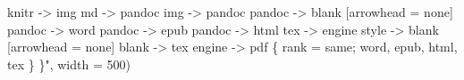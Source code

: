 \documentclass[12pt, oneside]{queensuthesis}
\numberwithin{equation}{chapter}       %
\newenvironment{Shaded}{\begin{snugshade}}{\end{snugshade}}
\newcommand{\AttributeTok}[1]{\textcolor[rgb]{0.77,0.63,0.00}{#1}}
\newcommand{\DecValTok}[1]{\textcolor[rgb]{0.00,0.00,0.81}{#1}}
\newcommand{\NormalTok}[1]{#1}
\newcommand{\StringTok}[1]{\textcolor[rgb]{0.31,0.60,0.02}{#1}}
\begin{document}
\begin{Shaded}
\begin{Highlighting}[]
\StringTok{                    knitr {-}\textgreater{} img}
\StringTok{                    md {-}\textgreater{} pandoc}
\StringTok{                    img {-}\textgreater{} pandoc}
\StringTok{                    pandoc {-}\textgreater{} blank [arrowhead = none]}
\StringTok{                    pandoc {-}\textgreater{} word}
\StringTok{                    pandoc {-}\textgreater{} epub}
\StringTok{                    pandoc {-}\textgreater{} html}
\StringTok{                    tex {-}\textgreater{} engine}
\StringTok{                    style {-}\textgreater{} blank [arrowhead = none]}
\StringTok{                    blank {-}\textgreater{} tex}
\StringTok{                    engine {-}\textgreater{} pdf}
\StringTok{                    \{ rank = same; word, epub, html, tex \}}
\StringTok{                  \}"}\NormalTok{, }\AttributeTok{width =} \DecValTok{500}\NormalTok{)}
\end{Highlighting}
\end{Shaded}
\end{document}
